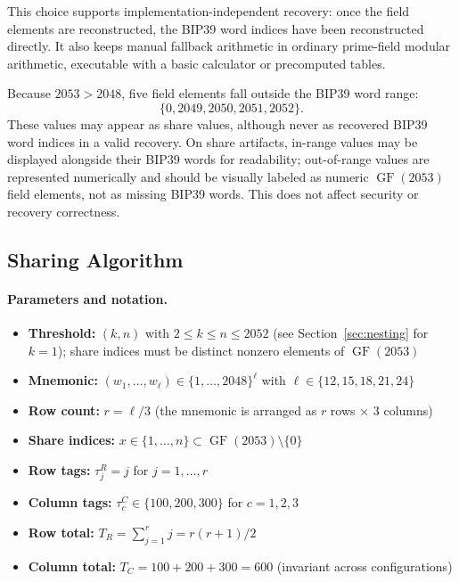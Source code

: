 \documentclass[11pt]{article}
\newcommand{\GF}{\operatorname{GF}}
\begin{document}
This choice supports implementation-independent recovery: once the field elements are reconstructed, the BIP39 word indices have been reconstructed directly. It also keeps manual fallback arithmetic in ordinary prime-field modular arithmetic, executable with a basic calculator or precomputed tables.

Because $2053 > 2048$, five field elements fall outside the BIP39 word range:
\[
    \{0, 2049, 2050, 2051, 2052\}.
\]
These values may appear as share values, although never as recovered BIP39 word indices in a valid recovery. On share artifacts, in-range values may be displayed alongside their BIP39 words for readability; out-of-range values are represented numerically and should be visually labeled as numeric $\GF(2053)$ field elements, not as missing BIP39 words. This does not affect security or recovery correctness.

\subsection{Sharing Algorithm}
\label{sec:sharing}

\paragraph{Parameters and notation.}
\begin{itemize}[noitemsep]
    \item \textbf{Threshold:} $(k, n)$ with $2 \leq k \leq n \leq 2052$ (see Section~\ref{sec:nesting} for $k = 1$); share indices must be distinct nonzero elements of $\GF(2053)$
    \item \textbf{Mnemonic:} $(w_1, \ldots, w_\ell) \in \{1, \ldots, 2048\}^\ell$ with $\ell \in \{12, 15, 18, 21, 24\}$
    \item \textbf{Row count:} $r = \ell / 3$ (the mnemonic is arranged as $r$ rows $\times$ 3 columns)
    \item \textbf{Share indices:} $x \in \{1, \ldots, n\} \subset \GF(2053) \setminus \{0\}$
    \item \textbf{Row tags:} $\tau^R_j = j$ for $j = 1, \ldots, r$
    \item \textbf{Column tags:} $\tau^C_c \in \{100, 200, 300\}$ for $c = 1, 2, 3$
    \item \textbf{Row total:} $T_R = \sum_{j=1}^{r} j = r(r+1)/2$
    \item \textbf{Column total:} $T_C = 100 + 200 + 300 = 600$ (invariant across configurations)
\end{itemize}
\end{document}
